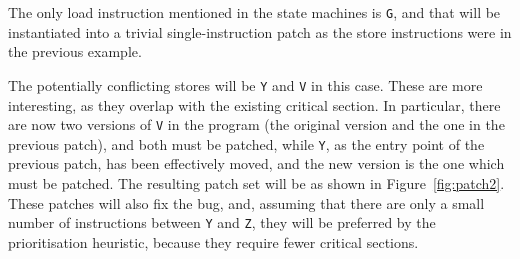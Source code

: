 \documentclass[10pt,letter,twocolumn]{sigplanconf}
\begin{document}
The only load instruction mentioned in the state machines is \verb|G|,
and that will be instantiated into a trivial single-instruction patch
as the store instructions were in the previous example.

The potentially conflicting stores will be \verb|Y| and \verb|V| in
this case.  These are more interesting, as they overlap with the
existing critical section.  In particular, there are now two versions
of \verb|V| in the program (the original version and the one in the
previous patch), and both must be patched, while \verb|Y|, as the
entry point of the previous patch, has been effectively moved, and the
new version is the one which must be patched.  The resulting patch set
will be as shown in Figure~\ref{fig:patch2}.  These patches will also
fix the bug, and, assuming that there are only a small number of
instructions between \verb|Y| and \verb|Z|, they will be preferred by
the prioritisation heuristic, because they require fewer critical
sections.
\end{document}
